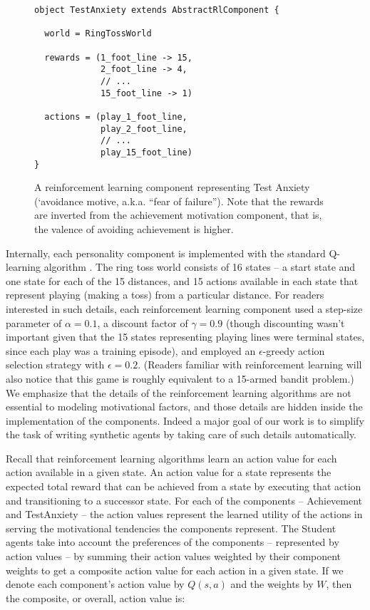 \begin{figure}[h]

\begin{lstlisting}
object TestAnxiety extends AbstractRlComponent {

  world = RingTossWorld

  rewards = (1_foot_line -> 15,
             2_foot_line -> 4,
             // ...
             15_foot_line -> 1)

  actions = (play_1_foot_line,
             play_2_foot_line,
             // ...
             play_15_foot_line)
}
\end{lstlisting}

\caption{A reinforcement learning component representing Test Anxiety (`avoidance motive, a.k.a. ``fear of failure'').  Note that the rewards are inverted from the achievement motivation component, that is, the valence of avoiding achievement is higher.}
\label{fig:testanxiety}
\end{figure}

Internally, each personality component is implemented with the standard Q-learning algorithm \cite{sutton1998reinforcement}.  The ring toss world consists of 16 states -- a start state and one state for each of the 15 distances, and 15 actions available in each state that represent playing (making a toss) from a particular distance.  For readers interested in such details, each reinforcement learning component used a step-size parameter of $\alpha = 0.1$, a discount factor of $\gamma = 0.9$ (though discounting wasn't important given that the 15 states representing playing lines were terminal states, since each play was a training episode), and employed an $\epsilon$-greedy action selection strategy with $\epsilon = 0.2$.  (Readers familiar with reinforcement learning will also notice that this game is roughly equivalent to a 15-armed bandit problem.)  We emphasize that the details of the reinforcement learning algorithms are not essential to modeling motivational factors, and those details are hidden inside the implementation of the components.  Indeed a major goal of our work is to simplify the task of writing synthetic agents by taking care of such details automatically.

Recall that reinforcement learning algorithms learn an action value for each action available in a given state.  An action value for a state represents the expected total reward that can be achieved from a state by executing that action and transitioning to a successor state. For each of the components -- Achievement and TestAnxiety -- the action values represent the learned utility of the actions in serving the motivational tendencies the components represent.  The Student agents take into account the preferences of the components -- represented by action values -- by summing their action values weighted by their component weights to get a composite action value for each action in a given state.  If we denote each component's action value by $Q(s, a)$ and the weights by $W$, then the composite, or overall, action value is:

